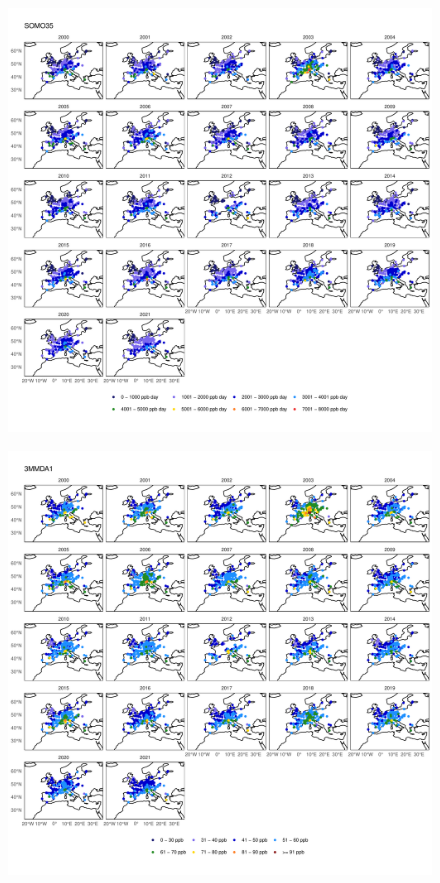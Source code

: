 \documentclass{article}
\begin{document}
\begin{figure}
\centering
\includegraphics[height=0.9\textheight]{figures/si_figures/fS12_metric_map_Europe_SOMO35.pdf}
\caption{}
\label{si_fig:metric_map_eu_SOMO35}
\end{figure}
\clearpage

\begin{figure}
\centering
\includegraphics[height=0.9\textheight]{figures/si_figures/fS13_metric_map_Europe_3MMDA1.pdf}
\caption{}
\label{si_fig:metric_map_eu_3MMDA1}
\end{figure}
\clearpage
\end{document}
